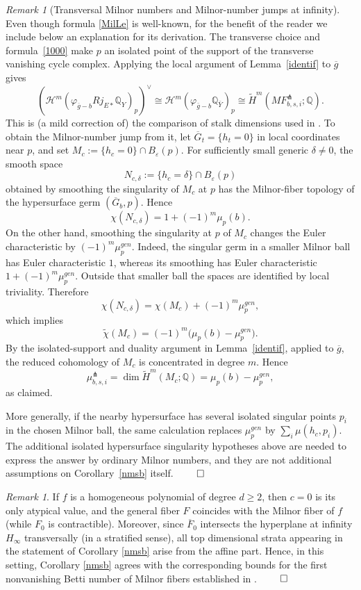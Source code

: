 \documentclass[12pt,leqno,twoside]{amsart}
\theoremstyle{remark}
\newtheorem{remark}[theorem]{\sc Remark}
\theoremstyle{remark}
\theoremstyle{definition}
\theoremstyle{remark}
\theoremstyle{remark}
\theoremstyle{remark}
\numberwithin{equation}{section}  %
\def\br{\begin{remark}}
\def\er{\end{remark}}
\newcommand{\cH}{\mathcal{H}}
\newcommand{\oF}{\overline{F}}
\begin{document}
\begin{remark}[Transversal Milnor numbers and Milnor-number jumps at infinity]
Even though formula \eqref{MilLe} is well-known, for the benefit of the reader we include below an explanation for its derivation. The transverse choice and formula~\eqref{1000} make $p$ an isolated point of the support of the transverse vanishing cycle complex. Applying the local argument of Lemma~\ref{identif} to $\overline{g}$ gives
\[
 \left(
 \cH^m(\varphi_{\overline g-b}Rj_{E*}\mathbb Q_Y)_p
 \right)^\vee
 \cong
 \cH^m(\varphi_{\bar g-b}\mathbb Q_{\bar Y})_p
 \cong
 \widetilde H^m(MF_{b,s,i}^{\pitchfork};\mathbb Q).
\]
This is (a mild correction of) the comparison of stalk dimensions used in \cite[Example~6.2.20]{Di}. To obtain the Milnor-number jump from it, let $\overline G_t=\{h_t=0\}$ in local coordinates near $p$, and set $M_c:=\{h_c=0\}\cap B_\varepsilon(p)$. For sufficiently small generic $\delta\ne0$, the smooth space
\[
 N_{c,\delta}:=\{h_c=\delta\}\cap B_\varepsilon(p)
\]
obtained by smoothing the singularity of $M_c$ at $p$ has the
Milnor-fiber topology of the hypersurface germ $(\overline G_b,p)$.
Hence \[\chi(N_{c,\delta})=1+(-1)^m\mu_p(b).\] 
On the other hand, smoothing the singularity at $p$ of $M_c$  changes the 
Euler characteristic by $(-1)^m\mu_p^{gen}$. Indeed, the singular germ in a smaller Milnor ball has Euler characteristic $1$, whereas its smoothing has Euler characteristic
$1+(-1)^m\mu_p^{gen}$. Outside that smaller ball the spaces are identified by local triviality.
Therefore
\[
 \chi(N_{c,\delta})
 =\chi(M_c)+(-1)^m\mu_p^{gen},
\]
which implies
\[
 \widetilde\chi(M_c)
 =(-1)^m\bigl(\mu_p(b)-\mu_p^{gen}\bigr).
\]
By the isolated-support and duality argument in Lemma~\ref{identif}, applied to $\overline g$, the reduced cohomology of $M_c$ is concentrated in degree $m$. Hence
\[
 \mu_{b,s,i}^{\pitchfork}
 =\dim\widetilde H^m(M_c;\mathbb Q)
 =\mu_p(b)-\mu_p^{gen},
\]
as claimed.

More generally, if the nearby hypersurface has several isolated singular points $p_i$ in the chosen Milnor ball, the same calculation replaces $\mu_p^{gen}$ by $\sum_i\mu(h_c,p_i)$. The additional isolated hypersurface singularity hypotheses above are needed to express the answer by ordinary Milnor numbers, and they are not additional assumptions on Corollary~\ref{nmsb} itself. $\hfill\qed$
\end{remark}

\br\label{whp2}
If $f$ is a homogeneous polynomial of degree $d \geq 2$, then $c=0$ is its only atypical value, and the general fiber $F$ coincides with the Milnor fiber of $f$ (while $F_0$ is contractible). Moreover, since $\oF_0$ intersects the hyperplane at infinity $H_\infty$ transversally (in a stratified sense), all top dimensional strata appearing in the statement of Corollary \ref{nmsb} arise from the affine part. Hence, in this setting, Corollary \ref{nmsb} agrees with the corresponding bounds for the first nonvanishing Betti number of Milnor fibers established in \cite[Thm.3.4(a)]{MPT2}.  $\hfill\qed$
\er
\end{document}
